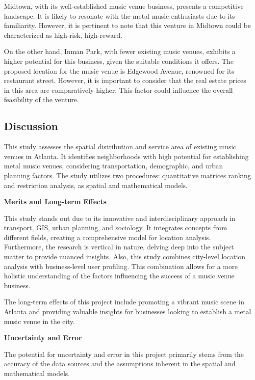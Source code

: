 \documentclass[11pt]{article}
\begin{document}
Midtown, with its well-established music venue business, presents a competitive landscape. It is likely to resonate with the metal music enthusiasts due to its familiarity. However, it is pertinent to note that this venture in Midtown could be characterized as high-risk, high-reward.

On the other hand, Inman Park, with fewer existing music venues, exhibits a higher potential for this business, given the suitable conditions it offers. The proposed location for the music venue is Edgewood Avenue, renowned for its restaurant street. However, it is important to consider that the real estate prices in this area are comparatively higher. This factor could influence the overall feasibility of the venture.

\subsection{Discussion}

This study assesses the spatial distribution and service area of existing music venues in Atlanta. It identifies neighborhoods with high potential for establishing metal music venues, considering transportation, demographic, and urban planning factors. The study utilizes two procedures: quantitative matrices ranking and restriction analysis, as spatial and mathematical models.


\textbf{Merits and Long-term Effects}

This study stands out due to its innovative and interdisciplinary approach in transport, GIS, urban planning, and sociology. It integrates concepts from different fields, creating a comprehensive model for location analysis. Furthermore, the research is vertical in nature, delving deep into the subject matter to provide nuanced insights. Also, this study combines city-level location analysis with business-level user profiling. This combination allows for a more holistic understanding of the factors influencing the success of a music venue business.

The long-term effects of this project include promoting a vibrant music scene in Atlanta and providing valuable insights for businesses looking to establish a metal music venue in the city.

\textbf{Uncertainty and Error}

The potential for uncertainty and error in this project primarily stems from the accuracy of the data sources and the assumptions inherent in the spatial and mathematical models.
\end{document}
